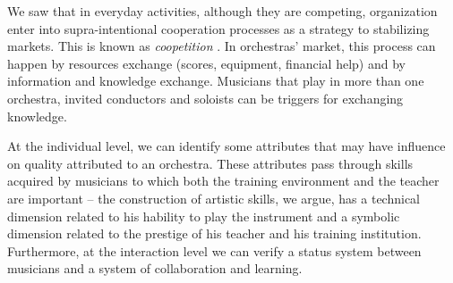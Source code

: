 \documentclass[a4paper, 12pt, openright, oneside, german, french, brazil, english, article]{abntex2}
\begin{document}
	We saw that in everyday activities, although they are competing, organization enter into supra-intentional cooperation processes as a strategy to stabilizing markets. This is known as \textit{coopetition} \cite{lazega2009theorie}. In orchestras' market, this process can happen by resources exchange (scores, equipment, financial help) and by information and knowledge exchange. Musicians that play in more than one orchestra, invited conductors and soloists can be triggers for exchanging knowledge.
	
	
	At the individual level, we can identify some attributes that may have influence on quality attributed to an orchestra. These attributes pass through skills acquired by musicians to which both the training environment and the teacher are important -- the construction of artistic skills, we argue, has a technical dimension related to his hability to play the instrument and a symbolic dimension related to the prestige of his teacher and his training institution. Furthermore, at the interaction level we can verify a status system between musicians and a system of collaboration and learning.
	
	
\end{document}
